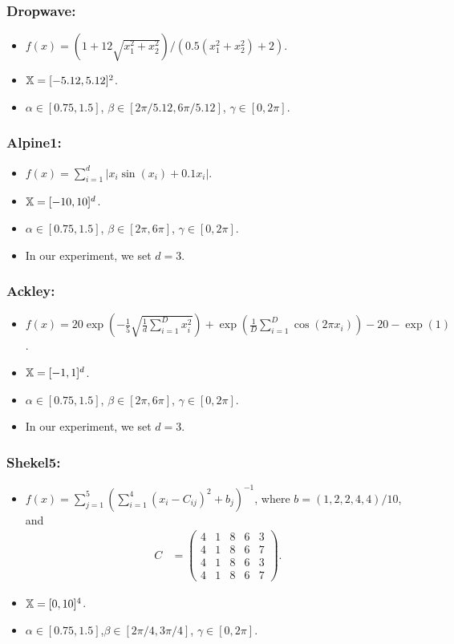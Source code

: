 \subsubsection*{Dropwave:}
\begin{itemize}
    \item $f(x)=\left(1 + 12\sqrt{x_1^2 + x_2^2}\right)/\left(0.5(x_1^2 + x_2^2) + 2\right)$.
    \item $\mathbb{X} = [-5.12, 5.12]^2$.
    \item $\alpha\in[0.75, 1.5]$, $\beta\in[2\pi/5.12, 6\pi/5.12]$, $\gamma\in[0, 2\pi]$.
\end{itemize}

\subsubsection*{Alpine1:}
\begin{itemize}
\item $f(x)= \sum_{i=1}^d\left|x_i \sin(x_i) + 0.1 x_i\right|$.
\item $\mathbb{X} = [-10, 10]^d$.
\item $\alpha\in[0.75, 1.5]$, $\beta\in[2\pi, 6\pi]$, $\gamma\in[0, 2\pi]$.
\item In our experiment, we set $d=3$.
\end{itemize}

\subsubsection*{Ackley:}
\begin{itemize}
\item $f(x)= 20 \exp\left(-\frac{1}{5}\sqrt{\frac{1}{d}\sum_{i=1}^D x_i^2}\right) + \exp\left(\frac{1}{D}\sum_{i=1}^D \cos(2\pi x_i)\right) - 20 - \exp(1)$.
\item $\mathbb{X} = [-1, 1]^d$.
\item $\alpha\in[0.75, 1.5]$, $\beta\in[2\pi, 6\pi]$, $\gamma\in[0, 2\pi]$.
\item In our experiment, we set $d=3$.
\end{itemize}

\subsubsection*{Shekel5:}
\begin{itemize}
\item $f(x)= \sum_{j=1}^5\left(\sum_{i=1}^4\left(x_i - C_{ij}\right)^2 + b_j\right)^{-1}$, where $b = (1, 2, 2, 4, 4)/10$, and
    \begin{align*}
        C &= \begin{pmatrix}
4 & 1 & 8 & 6 & 3\\
4 & 1 & 8 & 6 & 7\\
4 & 1 & 8 & 6 & 3\\
4 & 1 & 8 & 6 & 7
\end{pmatrix}.
    \end{align*}
\item $\mathbb{X} = [0, 10]^4$.
\item $\alpha\in[0.75, 1.5]$,$\beta\in[2\pi/4, 3\pi/4]$, $\gamma\in[0, 2\pi]$.
\end{itemize}

